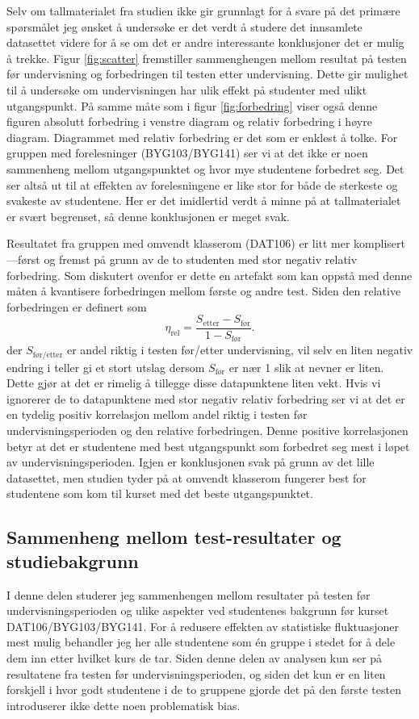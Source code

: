 \documentclass[a4paper,norsk,12pt]{article}
\begin{document}
Selv om tallmaterialet fra studien ikke gir grunnlagt for å svare på det primære spørsmålet jeg ønsket å undersøke er det verdt å studere det innsamlete datasettet videre for å se om det er andre interessante konklusjoner det er mulig å trekke. Figur \ref{fig:scatter} fremstiller sammenghengen mellom resultat på testen før undervisning og forbedringen til testen etter undervisning. Dette gir mulighet til å undersøke om undervisningen har ulik effekt på studenter med ulikt utgangspunkt. På samme måte som i figur \ref{fig:forbedring} viser også denne figuren absolutt forbedring i venstre diagram og relativ forbedring i høyre diagram. Diagrammet med relativ forbedring er det som er enklest å tolke. For gruppen med forelesninger (BYG103/BYG141) ser vi at det ikke er noen sammenheng mellom utgangspunktet og hvor mye studentene forbedret seg. Det ser altså ut til at effekten av forelesningene er like stor for både de sterkeste og svakeste av studentene. Her er det imidlertid verdt å minne på at tallmaterialet er svært begrenset, så denne konklusjonen er meget svak.

Resultatet fra gruppen med omvendt klasserom (DAT106) er litt mer komplisert---først og fremst på grunn av de to studenten med stor negativ relativ forbedring. Som diskutert ovenfor er dette en artefakt som kan oppstå med denne måten å kvantisere forbedringen mellom første og andre test. Siden den relative forbedringen er definert som 
\begin{displaymath}
	\eta_\text{rel} = \frac{S_\text{etter}-S_\text{før}}{1 - S_\text{før}}.
\end{displaymath}
der $S_\text{før/etter}$ er andel riktig i testen før/etter undervisning, vil selv en liten negativ endring i teller gi et stort utslag dersom $S_\text{før}$ er nær 1 slik at nevner er liten. Dette gjør at det er rimelig å tillegge disse datapunktene liten vekt. Hvis vi  ignorerer de to datapunktene med stor negativ relativ forbedring ser vi at det er en tydelig positiv korrelasjon mellom andel riktig i testen før undervisningsperioden og den relative forbedringen. Denne positive korrelasjonen betyr at det er studentene med best utgangspunkt som forbedret seg mest i løpet av undervisningsperioden. Igjen er konklusjonen svak på grunn av det lille datasettet, men studien tyder på at omvendt klasserom fungerer best for studentene som kom til kurset med det beste utgangspunktet. 

\subsection{Sammenheng mellom test-resultater og studiebakgrunn}
I denne delen studerer jeg sammenhengen mellom resultater på testen før undervisningsperioden og ulike aspekter ved studentenes bakgrunn før kurset DAT106/BYG103/BYG141. For å redusere effekten av statistiske fluktuasjoner mest mulig behandler jeg her alle studentene som \'en gruppe i stedet for å dele dem inn etter hvilket kurs de tar. Siden denne delen av analysen kun ser på resultatene fra testen før undervisningsperioden, og siden det kun er en liten forskjell i hvor godt studentene i de to gruppene gjorde det på den første testen introduserer ikke dette noen problematisk bias.
\end{document}
